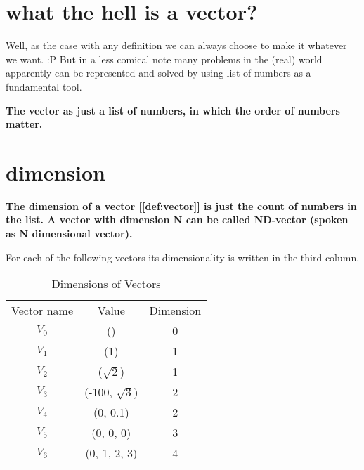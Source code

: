 \documentclass[../main.tex]{subfiles}
\begin{document}
\section{what the hell is a vector?}

Well, as the case with any definition we can always choose to make it whatever we want. :P
But in a less comical note many problems in the (real) world apparently can be represented and solved by using list of numbers as a fundamental tool.

\begin{definition}
  \label{def:vector}

  \textbf{The vector as just a list of numbers, in which the order of numbers matter.}

\end{definition}


\section{dimension}
\begin{definition}
  \label{def:vector_dimension}

  \textbf{The dimension of a vector [\ref{def:vector}] is just the count of numbers in the list.
A vector with dimension N can be called ND-vector (spoken as N dimensional vector).}

\end{definition}

For each of the following vectors its dimensionality is written in the third column.

\begin{table}[ht]
  \centering
  \begin{tabular}{ c  c  c }
    Vector name & Value & Dimension\\
    $ V_0 $ & () & 0\\
    $ V_1 $ & (1) & 1\\
    $ V_2 $ & ($\sqrt{2}$) & 1\\
    $ V_3 $ & (-100, $\sqrt{3}$) & 2\\
    $ V_4 $ & (0, 0.1) & 2\\
    $ V_5 $ & (0, 0, 0) & 3\\
    $ V_6 $ & (0, 1, 2, 3) & 4\\
  \end{tabular}
\caption{Dimensions of Vectors}
\label{tab:dim}
\end{table}

\pagebreak
\end{document}
